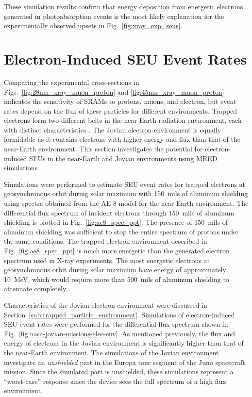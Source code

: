 These simulation results confirm that energy deposition from energetic electrons generated in photoabsorption events is the most likely explanation for the experimentally observed upsets in Fig.~\ref{fig:xray_exp_seus}. %

\section{Electron-Induced SEU Event Rates} %
\label{sec:electron_induced_seu_event_rates}
Comparing the experimental cross-sections in Figs.~\ref{fig:28nm_xray_muon_proton} and \ref{fig:45nm_xray_muon_proton} indicates the sensitivity of SRAMs to protons, muons, and electron, but event rates depend on the flux of these particles for different environments. 
Trapped electrons form two different belts in the near Earth radiation environment, each with distinct characteristics \cite{Bourdarie:kj, Xapsos:2013cu}.
The Jovian electron environment is equally formidable as it contains electrons with higher energy and flux than that of the near-Earth environment.
This section investigates the potential for electron-induced SEUs in the near-Earth and Jovian environments using MRED simulations.

Simulations were performed to estimate SEU event rates for trapped electrons at geosynchronous orbit during solar maximum with 150~mils of aluminum shielding using spectra obtained from the AE-8 model for the near-Earth environment.
The differential flux spectrum of incident electrons through 150~mils of aluminum shielding is plotted in Fig.~\ref{fig:ae8_spec_ppt}.
The presence of 150~mils of aluminum shielding was sufficient to stop the entire spectrum of protons under the same conditions.
The trapped electron environment described in Fig.~\ref{fig:ae8_spec_ppt} is much more energetic than the generated electron spectrum used in X-ray experiments.
The most energetic electrons at geosynchronous orbit during solar maximum have energy of approximately 10~MeV, which would require more than 500~mils of aluminum shielding to attenuate completely \cite{Bourdarie:kj,Xapsos:2013cuƒ}.

Characteristics of the Jovian electron environment were discussed in Section~\ref{sub:trapped_particle_environment}.
Simulations of electron-induced SEU event rates were performed for the differential flux spectrum shown in Fig.~\ref{fig:nasa-jovian-missions-elec-env}.
As mentioned previously, the flux and energy of electrons in the Jovian environment is significantly higher than that of the near-Earth environment.
The simulations of the Jovian environment investigate an \emph{unshielded} part in the Europa tour segment of the Juno spacecraft mission.
Since the simulated part is unshielded, these simulations represent a ``worst-case'' response since the device sees the full spectrum of a high flux environment.

